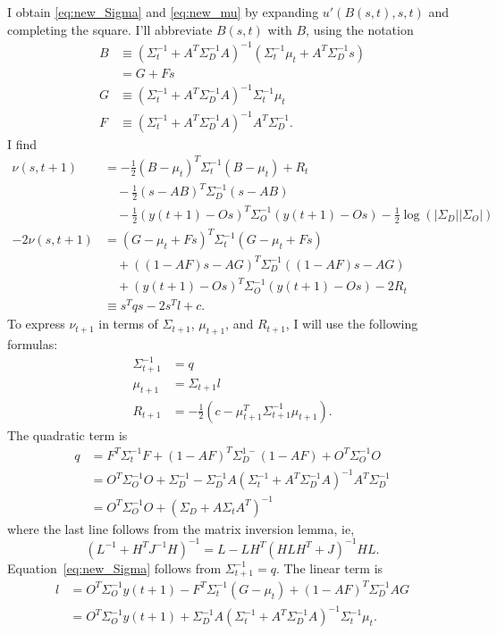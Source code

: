 \documentclass[12pt]{article}
\newcommand{\ti}[2]{{#1}{(#2)}}                         %
\newcommand{\logdet}{\log\left(\left|\Sigma_D\right| \left| \Sigma_O
    \right| \right)}
\begin{document}
I obtain \eqref{eq:new_Sigma} and \eqref{eq:new_mu} by expanding
$u'(B(s,t),s,t)$ and completing the square.  I'll abbreviate $B(s,t)$
with $B$, using the notation
\begin{align*}
  B &\equiv \left( \Sigma_t^{-1} + A^T \Sigma_D^{-1} A \right)^{-1}
  \left( \Sigma_t^{-1} \mu_t + A^T \Sigma_D^{-1} s \right) \\
  &= G + Fs \\
  G &\equiv \left( \Sigma_t^{-1} + A^T \Sigma_D^{-1} A \right)^{-1}
  \Sigma_t^{-1} \mu_t \\
  F &\equiv  \left( \Sigma_t^{-1} + A^T \Sigma_D^{-1} A \right)^{-1}
  A^T \Sigma_D^{-1}.
\end{align*}
I find
\begin{align*}
  \nu(s,t+1) &= -\frac{1}{2}(B-\mu_{t})^T \Sigma_{t}^{-1}
  (B-\mu_{t}) + R_t\\
  &\quad - \frac{1}{2} (s-AB)^T \Sigma_{D}^{-1} (s-AB)\\
  &\quad - \frac{1}{2}(\ti{y}{t+1}-O s)^T \Sigma_{O}^{-1}
  (\ti{y}{t+1}-Os) -\frac{1}{2} \logdet\\
  -2 \nu(s,t+1) &= (G-\mu_{t}+Fs)^T \Sigma_{t}^{-1} (G-\mu_{t}+Fs) \\
  &\quad + ((1-AF)s-AG)^T \Sigma_{D}^{-1} ((1-AF)s-AG)\\
  &\quad + (\ti{y}{t+1}-O s)^T \Sigma_{O}^{-1} (\ti{y}{t+1}-Os) -2R_t \\
  &\equiv s^T q s - 2s^T l + c.
\end{align*}
To express $\nu_{t+1}$ in terms of $\Sigma_{t+1}$, $\mu_{t+1}$, and
$R_{t+1}$, I will use the following formulas:
\begin{align*}
  \Sigma_{t+1}^{-1} &= q \\
  \mu_{t+1} &= \Sigma_{t+1} l \\
  R_{t+1} &= -\frac{1}{2} \left( c - \mu_{t+1}^T \Sigma_{t+1}^{-1}
    \mu_{t+1} \right) .
\end{align*}
The quadratic term is
\begin{align*}
  q &= F^T\Sigma_t^{-1}F + (1-AF)^T\Sigma_D^{1-}(1-AF) +
  O^T\Sigma_O^{-1}O \\
  &= O^T\Sigma_O^{-1}O + \Sigma_D^{-1} - \Sigma_D^{-1}A
  ( \Sigma_t^{-1} + A^T\Sigma_D^{-1}A )^{-1}A^T\Sigma_D^{-1}\\
  &= O^T\Sigma_O^{-1}O + (\Sigma_D + A \Sigma_t A^T)^{-1}
\end{align*}
where the last line follows from the matrix inversion lemma, ie,
\begin{equation*}
  (L^{-1} + H^T J^{-1} H)^{-1} = L - LH^T (HLH^T + J)^{-1} HL.
\end{equation*}
Equation~\eqref{eq:new_Sigma} follows from $\Sigma_{t+1}^{-1} = q$.
The linear term is
\begin{align*}
  l &= O^T\Sigma_O^{-1}y(t+1) - F^T \Sigma_t^{-1}(G-\mu_t) +
  (1-AF)^T\Sigma_D^{-1}AG \\
  &= O^T\Sigma_O^{-1}y(t+1) + \Sigma_D^{-1}A \left( \Sigma_t^{-1} +
    A^T \Sigma_D^{-1} A \right)^{-1} \Sigma_t^{-1} \mu_t.
\end{align*}
\end{document}
